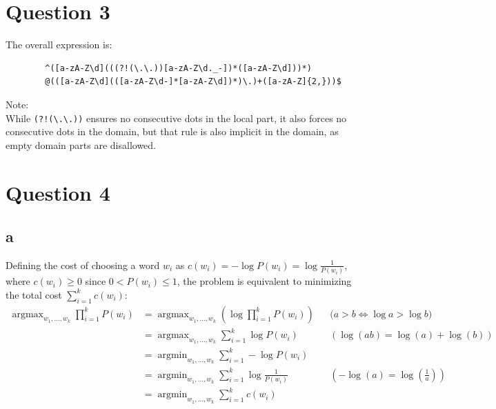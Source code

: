 \documentclass{article}
\DeclareMathOperator*{\argmax}{argmax}
\DeclareMathOperator*{\argmin}{argmin}
\numberwithin{equation}{section}
\begin{document}
    \section*{Question 3}
    The overall expression is:
    \begin{verbatim}
        ^([a-zA-Z\d](((?!(\.\.))[a-zA-Z\d._-])*([a-zA-Z\d]))*)
        @(([a-zA-Z\d](([a-zA-Z\d-]*[a-zA-Z\d])*)\.)+([a-zA-Z]{2,}))$
    \end{verbatim}
    Note:\\
    While \verb|(?!(\.\.))| ensures no consecutive dots in the local part, it also forces no consecutive dots in the domain, but that rule is also implicit in the domain, as empty domain parts are disallowed.


    \section*{Question 4}
    \subsection*{a}
    Defining the cost of choosing a word $w_i$ as $c(w_i) =
        -\log P(w_i) = \log \frac{1}{P(w_i)}$, where $c(w_i) \ge 0$ since $0 < P(w_i) \le 1$,
        the problem is equivalent to minimizing the total cost $\sum_{i=1}^k c(w_i)$:
    \begin{align*}
        \argmax_{w_1, \dots, w_k} \prod_{i=1}^k P(w_i)
        &= \argmax_{w_1, \dots, w_k} (\log \prod_{i = 1}^{k}P(w_i))
            && \text{($a > b \iff \log a > \log b$)} \\
        &= \argmax_{w_1, \dots, w_k} \sum_{i=1}^k \log P(w_i)
            && (\log(ab) = \log(a) + \log(b)) \\
        &= \argmin_{w_1, \dots, w_k} \sum_{i=1}^k -\log P(w_i) \\
        &= \argmin_{w_1, \dots, w_k} \sum_{i=1}^k \log \frac{1}{P(w_i)}
            && (-\log(a) = \log(\frac{1}{a})) \\
        &= \argmin_{w_1, \dots, w_k} \sum_{i=1}^k c(w_i)
    \end{align*}
\end{document}
